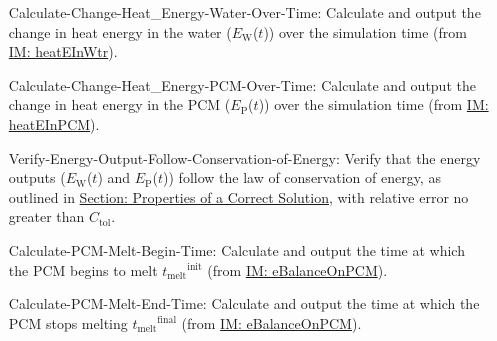 \documentclass[12pt]{article}
\begin{document}
\begin{itemize}
\item[Calculate-Change-Heat\_Energy-Water-Over-Time:\phantomsection\label{calcChgHeatEnergyWtrOverTime}]{Calculate and output the change in heat energy in the water (${E_{\text{W}}}$($t$)) over the simulation time (from \hyperref[IM:heatEInWtr]{IM: heatEInWtr}).}
\item[Calculate-Change-Heat\_Energy-PCM-Over-Time:\phantomsection\label{calcChgHeatEnergyPCMOverTime}]{Calculate and output the change in heat energy in the PCM (${E_{\text{P}}}$($t$)) over the simulation time (from \hyperref[IM:heatEInPCM]{IM: heatEInPCM}).}
\item[Verify-Energy-Output-Follow-Conservation-of-Energy:\phantomsection\label{verifyEnergyOutput}]{Verify that the energy outputs (${E_{\text{W}}}$($t$) and ${E_{\text{P}}}$($t$)) follow the law of conservation of energy, as outlined in \hyperref[Sec:CorSolProps]{Section: Properties of a Correct Solution}, with relative error no greater than ${C_{\text{tol}}}$.}
\item[Calculate-PCM-Melt-Begin-Time:\phantomsection\label{calcPCMMeltBegin}]{Calculate and output the time at which the PCM begins to melt ${{t_{\text{melt}}}^{\text{init}}}$ (from \hyperref[IM:eBalanceOnPCM]{IM: eBalanceOnPCM}).}
\item[Calculate-PCM-Melt-End-Time:\phantomsection\label{calcPCMMeltEnd}]{Calculate and output the time at which the PCM stops melting ${{t_{\text{melt}}}^{\text{final}}}$ (from \hyperref[IM:eBalanceOnPCM]{IM: eBalanceOnPCM}).}
\end{itemize}
\end{document}
